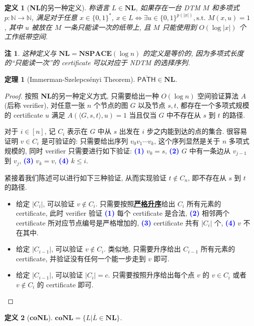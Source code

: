 \documentclass[8pt]{article}
\theoremstyle{compact}
\newtheorem{theorem}{定理}[section]
\newtheorem{definition}{定义}[section]
\newtheorem{remark}{注}[section]
\def\obj#1{\textbf{\uline{#1}}}
\def\num#1{\textnormal{\textbf{\mbox{\textcolor{blue}{(#1)}}}}}
\def\le{\leqslant}
\def\NSPACE{\textbf{NSPACE}}
\def\NL{\textbf{NL}}
\def\coNL{\textbf{coNL}}
\begin{document}
\begin{definition}[\NL 的另一种定义]
	称语言 $L \in \NL$, 如果存在一台 DTM $M$ 和多项式 $p: \mathbb N \to \mathbb N$, 满足对于任意 $x \in \{0, 1\}^*$, $x \in L \Leftrightarrow \exists u \in \{0, 1\}^{p(|x|)}, \text{s.t. } M(x, u) = 1$, 其中 $u$ 被放在 $M$ 一条只能读一次的纸带上, 且 $M$ 只能使用到 $O(\log |x|)$ 个工作纸带空间.
\end{definition}
\begin{remark}
	这种定义与 $\NL = \NSPACE(\log n)$ 的定义是等价的, 因为多项式长度的“只能读一次”的 certificate 可以对应于 NDTM 的选择序列.
\end{remark}
\begin{theorem}[Immerman-Szelepcsényi Theorem]
	$\overline{\textsf{PATH}} \in \NL$.
\end{theorem}
\begin{proof}
	按照 \NL 的另一种定义方式, 只需要给出一种 $O(\log n)$ 空间验证算法 $A$(后称 verifier), 对任意一张 $n$ 个节点的图 $G$ 以及节点 $s, t$, 都存在一个多项式规模的 certificate $u$ 满足 $A(\langle G, s, t \rangle, u) = 1$ 当且仅当 $G$ 中不存在从 $s$ 到 $t$ 的路径.

	对于 $i \in [n]$, 记 $C_i$ 表示在 $G$ 中从 $s$ 出发在 $i$ 步之内能到达的点的集合. 很容易证明 $v \in C_i$ 是可验证的: 只需要给出序列 $v_0v_1 \cdots v_k$, 这个序列显然是关于 $n$ 多项式规模的, 同时 verifier 只需要进行如下验证: \num{1} $v_0 = s$, \num{2} $G$ 中有一条边从 $v_{j-1}$ 到 $v_j$, \num{3} $v_k = v$, \num{4} $k \le i$. 

	紧接着我们陈述可以进行如下三种验证, 从而实现验证 $t \notin C_n$, 即不存在从 $s$ 到 $t$ 的路径.
	\begin{itemize}
		\item 给定 $|C_i|$, 可以验证 $v \notin C_i$. 只需要按照\obj{严格升序}给出 $C_i$ 所有元素的 certificate, 此时 verifier 验证 \num{1} 每个 certificate 是合法, \num{2} 相邻两个 certificate 所对应节点编号是严格增加的, \num{3} certificate 共有 $|C_i|$ 个, \num{4} $v$ 不在其中.
		\item 给定 $|C_{i-1}|$, 可以验证 $v \notin C_i$. 类似地, 只需要升序给出 $C_{i-1}$ 所有元素的 certificate, 并验证没有任何一个能一步走到 $v$ 即可.
		\item 给定 $|C_{i-1}|$, 可以验证 $|C_i| = c$. 只需要按照升序给出每个点 $v$ 的 $v \in C_i$ 或者 $v \notin C_i$ 的 certificate 即可.
	\end{itemize}
\end{proof}

\begin{definition}[\coNL]
	$\coNL = \{L | \overline{L} \in \NL\}$.
\end{definition}
\end{document}
